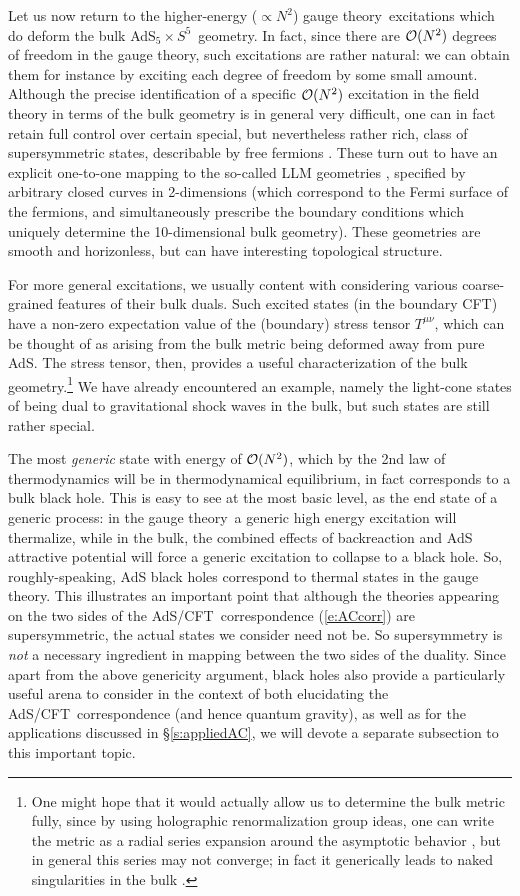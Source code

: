 \documentclass[12pt,a4paper]{article}
\def\sect#1{\S\ref{#1}}
\def\req#1{(\ref{#1})}
\def\AC{AdS/CFT}
\def\GT{gauge theory}
\def\QG{quantum gravity}
\def\adss#1#2{AdS$_{#1} \times S^{#2}$}
\begin{document}
Let us now return to the higher-energy ($\propto N^2$) \GT\ excitations which do deform the bulk \adss55\ geometry.  In fact, since there are ${\cal O}(N^2)$ degrees of freedom in the \GT, such excitations are rather natural: we can obtain them for instance by exciting each degree of freedom by some small amount.
Although the precise identification of a specific ${\cal O}(N^2)$ excitation in the field theory in terms of the bulk geometry is in general very difficult, one can in fact retain full control over certain  special, but nevertheless rather rich, class of supersymmetric states, describable by free fermions \cite{Berenstein:2004kk,Corley:2001zk}.  These turn out to have an explicit one-to-one mapping to the so-called LLM geometries \cite{Lin:2004nb}, specified by arbitrary closed curves in 2-dimensions (which correspond to the Fermi surface of the fermions, and simultaneously prescribe the boundary conditions which uniquely determine the 10-dimensional bulk geometry).  These geometries are smooth and horizonless, but can have interesting topological structure.

For more general excitations, we usually content with considering various coarse-grained features of their bulk duals.  Such excited states (in the boundary CFT) have a non-zero expectation value of the (boundary) stress tensor $T^{\mu\nu}$, which can be thought of as arising from the bulk metric being deformed away from pure AdS. The stress tensor, then, provides a useful characterization of the bulk geometry.\footnote{
One might hope that it would actually allow us to determine the bulk metric fully, since by using holographic renormalization group ideas, one can write the metric as a radial series expansion around the asymptotic behavior \cite{deHaro:2000xn}, but in general this series may not converge; in fact it generically leads to naked singularities in the bulk \cite{Bhattacharyya:2008jc}.
}  We have already encountered an example, namely the light-cone states of \cite{Horowitz:1999gf} being dual to gravitational shock waves in the bulk, but such states are still rather special.  

The most {\it generic} state with energy of ${\cal O}(N^2)$, which by the 2nd law of thermodynamics will be in thermodynamical equilibrium, in fact corresponds to a bulk black hole.  This is easy to see at the most basic level, as the end state of a generic process: in the \GT\ a generic high energy excitation will thermalize, while in the bulk, the combined effects of backreaction and AdS attractive potential will force a generic excitation to collapse to a black hole.
So, roughly-speaking, AdS black holes correspond to thermal states in the \GT.  This illustrates an important point that although the theories appearing on the two sides of the \AC\ correspondence \req{e:ACcorr} are supersymmetric, the actual  states we consider need not be.  So supersymmetry is {\it not} a necessary ingredient in mapping between the two sides of the duality.
Since apart from the above genericity argument, black holes also provide  a particularly useful arena to consider in the context of both elucidating the \AC\ correspondence (and hence \QG), as well as for the applications discussed in \sect{s:appliedAC}, we will devote a separate subsection to this important topic.  
\end{document}
